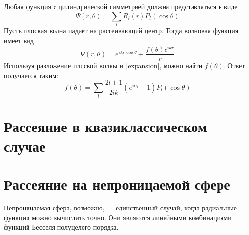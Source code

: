 \documentclass{article}
\begin{document}
Любая функция с цилиндрической симметрией должна представляться в виде
\begin{equation}
    \label{expansion}
    \Psi(r,\theta) = \sum_l R_l(r) P_l(\cos{\theta})
\end{equation}
Пусть плоская волна падает на рассеивающий центр. Тогда волновая функция имеет вид
\begin{equation}
    \Psi(r,\theta) = e^{ikr\cos{\theta}} + \frac{f(\theta)e^{ikr}}{r}
\end{equation}
Используя разложение плоской волны и \eqref{expansion}, можно найти $f(\theta)$. Ответ
получается таким:
\begin{equation}
    f(\theta) = \sum_l \frac{2l+1}{2ik} (e^{i\alpha_l} - 1) P_l(\cos{\theta})
\end{equation}

\section{Рассеяние в квазиклассическом случае}

\section{Рассеяние на непроницаемой сфере}
Непроницаемая сфера, возможно, --- единственный случай, когда радиальные функции можно
вычислить точно. Они являются линейными комбинациями функций Бесселя полуцелого порядка.
\end{document}

